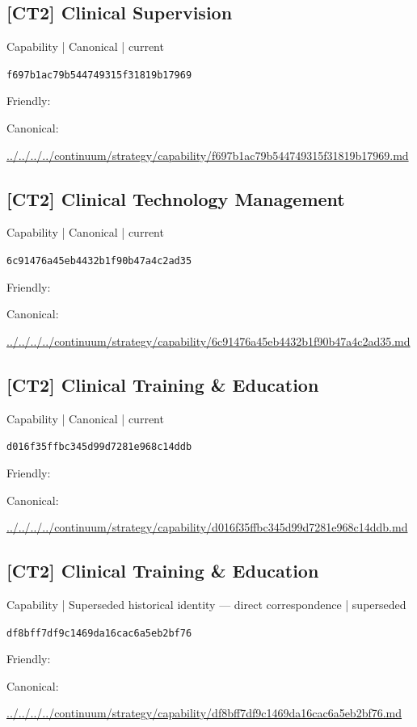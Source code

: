 \documentclass[10pt,a4paper]{article}
\begin{document}
\subsection*{[CT2] Clinical Supervision}
{\small Capability | Canonical | current}\par
\texttt{f697b1ac79b544749315f31819b17969}\par
Friendly: \par
Canonical: \par
{\footnotesize\url{../../../../continuum/strategy/capability/f697b1ac79b544749315f31819b17969.md}}\par
\subsection*{[CT2] Clinical Technology Management}
{\small Capability | Canonical | current}\par
\texttt{6c91476a45eb4432b1f90b47a4c2ad35}\par
Friendly: \par
Canonical: \par
{\footnotesize\url{../../../../continuum/strategy/capability/6c91476a45eb4432b1f90b47a4c2ad35.md}}\par
\subsection*{[CT2] Clinical Training \& Education}
{\small Capability | Canonical | current}\par
\texttt{d016f35ffbc345d99d7281e968c14ddb}\par
Friendly: \par
Canonical: \par
{\footnotesize\url{../../../../continuum/strategy/capability/d016f35ffbc345d99d7281e968c14ddb.md}}\par
\subsection*{[CT2] Clinical Training \& Education}
{\small Capability | Superseded historical identity — direct correspondence | superseded}\par
\texttt{df8bff7df9c1469da16cac6a5eb2bf76}\par
Friendly: \par
Canonical: \par
{\footnotesize\url{../../../../continuum/strategy/capability/df8bff7df9c1469da16cac6a5eb2bf76.md}}\par
\end{document}
